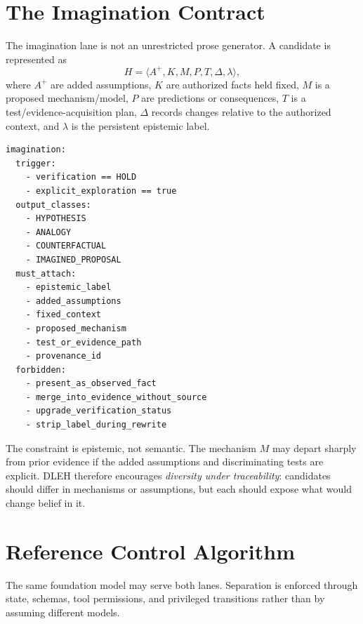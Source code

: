 \documentclass[10pt,twocolumn]{article}
\begin{document}
\section{The Imagination Contract}
The imagination lane is not an unrestricted prose generator. A candidate is represented as
\begin{equation}
H = \langle A^+, K, M, P, T, \Delta, \lambda \rangle,
\end{equation}
where $A^+$ are added assumptions, $K$ are authorized facts held fixed, $M$ is a proposed mechanism/model, $P$ are predictions or consequences, $T$ is a test/evidence-acquisition plan, $\Delta$ records changes relative to the authorized context, and $\lambda$ is the persistent epistemic label.

\begin{lstlisting}[caption={Reference imagination contract.},label={lst:contract}]
imagination:
  trigger:
    - verification == HOLD
    - explicit_exploration == true
  output_classes:
    - HYPOTHESIS
    - ANALOGY
    - COUNTERFACTUAL
    - IMAGINED_PROPOSAL
  must_attach:
    - epistemic_label
    - added_assumptions
    - fixed_context
    - proposed_mechanism
    - test_or_evidence_path
    - provenance_id
  forbidden:
    - present_as_observed_fact
    - merge_into_evidence_without_source
    - upgrade_verification_status
    - strip_label_during_rewrite
\end{lstlisting}

The constraint is epistemic, not semantic. The mechanism $M$ may depart sharply from prior evidence if the added assumptions and discriminating tests are explicit. DLEH therefore encourages \emph{diversity under traceability}: candidates should differ in mechanisms or assumptions, but each should expose what would change belief in it.

\section{Reference Control Algorithm}
The same foundation model may serve both lanes. Separation is enforced through state, schemas, tool permissions, and privileged transitions rather than by assuming different models.
\end{document}
